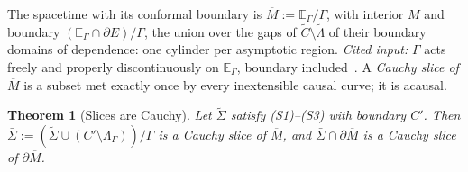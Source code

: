 \documentclass[aps,prd,onecolumn,superscriptaddress,nofootinbib,amsmath,amssymb,11pt]{revtex4-2}
\newtheorem{theorem}{Theorem}[section]
\theoremstyle{definition}
\newcommand{\Mbar}{\overline{M}}
\newcommand{\EG}{\mathbb{E}_\Gamma}
\begin{document}
The spacetime with its conformal boundary is $\Mbar:=\EG/\Gamma$, with interior $M$ and boundary $(\EG\cap\partial E)/\Gamma$,
the union over the gaps of $\tilde C\setminus\tilde\Lambda$ of their boundary domains of dependence: one cylinder per asymptotic
region. \emph{Cited input:} $\Gamma$ acts freely and properly discontinuously on $\EG$, boundary
included~\cite{Barbot2008}. A \emph{Cauchy slice of $\Mbar$} is a subset met exactly once by every inextensible causal
curve; it is acausal.

\begin{theorem}[Slices are Cauchy]\label{thm:C}
Let $\tilde\Sigma$ satisfy (S1)--(S3) with boundary $C'$. Then $\bar\Sigma:=(\tilde\Sigma\cup(C'\setminus\Lambda_\Gamma))/\Gamma$ is
a Cauchy slice of $\Mbar$, and $\bar\Sigma\cap\partial\Mbar$ is a Cauchy slice of $\partial\Mbar$.
\end{theorem}
\end{document}
